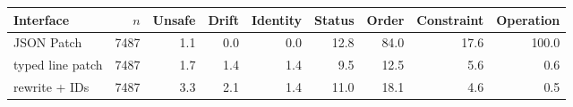 \begin{tabular}{lrrrrrrrr}
\toprule
Interface & $n$ & Unsafe & Drift & Identity & Status & Order & Constraint & Operation \\
\midrule
JSON Patch & 7487 & 1.1 & 0.0 & 0.0 & 12.8 & 84.0 & 17.6 & 100.0 \\
typed line patch & 7487 & 1.7 & 1.4 & 1.4 & 9.5 & 12.5 & 5.6 & 0.6 \\
rewrite + IDs & 7487 & 3.3 & 2.1 & 1.4 & 11.0 & 18.1 & 4.6 & 0.5 \\
\bottomrule
\end{tabular}
